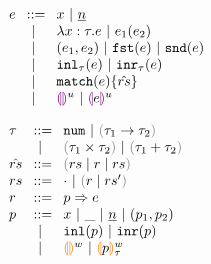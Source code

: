 
\begin{figure}[ht]
    \centering
    \begin{minipage}{.5\linewidth}
  $\arraycolsep=4pt\begin{array}{lll}
    e & ::= &
      x ~\vert~
      \hnum{n} \\
      & ~\vert~ &
      \hlam{x}{\tau}{e} ~\vert~
      \hap{e_1}{e_2} \\
      & ~\vert~ &
      \hpair{e_1}{e_2} ~\vert~
      \hfst{e} ~\vert~ \hsnd{e} \\
      & ~\vert~ &
      \hinl{\tau}{e} ~\vert~
      \hinr{\tau}{e} \\
      & ~\vert~ &
      \hmatch{e}{\hat{rs}} \\
      & ~\vert~ &
      \hehole{u} ~\vert~
      \hhole{e}{u} \\
    \end{array}$
    \end{minipage}%
    \begin{minipage}{.5\linewidth}
  $\arraycolsep=4pt\begin{array}{lll}
    \tau & ::= &
      \tnum ~\vert~
      \tarr{\tau_1}{\tau_2}\\
      & ~\vert~ &
      \tprod{\tau_1}{\tau_2} ~\vert~
      \tsum{\tau_1}{\tau_2} \\
    \hat{rs} & ::= &
      \zrulsP{rs}{r}{rs} \\
    rs & ::= &
      \cdot ~\vert~ \hrulesP{r}{rs'} \\
    r & ::= &
      \hrul{p}{e} \\
    p & ::= &
      x ~\vert~
      \_ ~\vert~
      \hnum{n} ~\vert~
      \hpair{p_1}{p_2} \\
      & ~\vert~ &
      \hinlp{p} ~\vert~
      \hinrp{p} \\
      & ~\vert~ &
      \heholep{w} ~\vert~
      \hholep{p}{w}{\tau}
    \end{array}$
    \end{minipage}
\end{figure}
